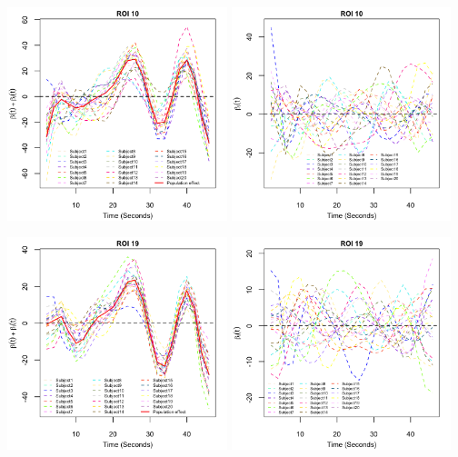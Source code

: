 \includegraphics[width=0.48\textwidth]{ROI10_betat.png}
\includegraphics[width=0.48\textwidth]{ROI10_betait.png}

\includegraphics[width=0.48\textwidth]{ROI19_betat.png}
\includegraphics[width=0.48\textwidth]{ROI19_betait.png}


